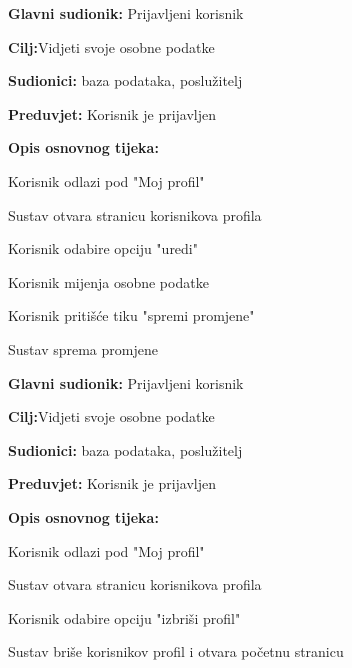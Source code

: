 \noindent {}
\begin{packed_item}
	
	\item \textbf{Glavni sudionik: }Prijavljeni korisnik
	\item  \textbf{Cilj:}Vidjeti svoje osobne podatke
	\item  \textbf{Sudionici:} baza podataka, poslužitelj
	\item  \textbf{Preduvjet:} Korisnik je prijavljen
	\item  \textbf{Opis osnovnog tijeka:}
	
	\item[] \begin{packed_enum}
		
		\item Korisnik odlazi pod "Moj profil"
		\item Sustav otvara stranicu korisnikova profila 
		\item Korisnik odabire opciju "uredi"
		\item Korisnik mijenja osobne podatke
		\item Korisnik pritišće tiku "spremi promjene"
		\item Sustav sprema promjene 
		
	\end{packed_enum}
\end{packed_item}

\noindent {}
\begin{packed_item}
	
	\item \textbf{Glavni sudionik: }Prijavljeni korisnik
	\item  \textbf{Cilj:}Vidjeti svoje osobne podatke
	\item  \textbf{Sudionici:} baza podataka, poslužitelj
	\item  \textbf{Preduvjet:} Korisnik je prijavljen
	\item  \textbf{Opis osnovnog tijeka:}
	
	\item[] \begin{packed_enum}
		
		\item Korisnik odlazi pod "Moj profil"
		\item Sustav otvara stranicu korisnikova profila 
		\item Korisnik odabire opciju "izbriši profil"
		\item Sustav briše korisnikov profil i otvara početnu stranicu
		
	\end{packed_enum}
\end{packed_item}

